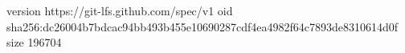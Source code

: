 version https://git-lfs.github.com/spec/v1
oid sha256:dc26004b7bdcac94bb493b455e10690287cdf4ea4982f64c7893de8310614d0f
size 196704
